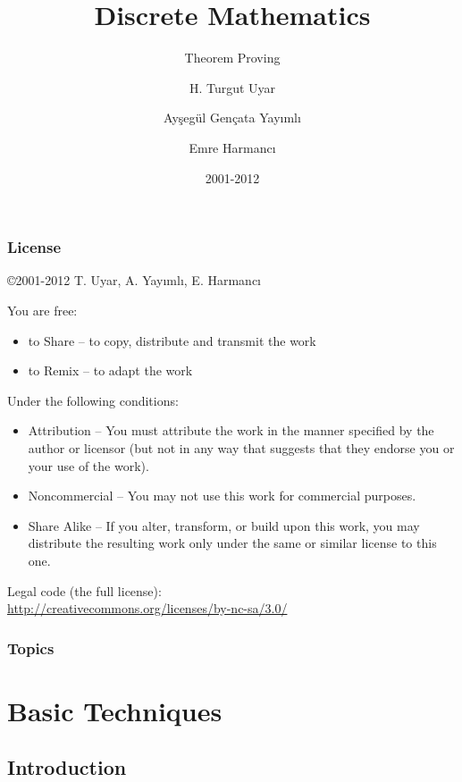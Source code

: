 \documentclass[dvipsnames]{beamer}
\title{Discrete Mathematics}
\subtitle{Theorem Proving}
\author{H. Turgut Uyar \and Ayşegül Gençata Yayımlı \and Emre Harmancı}
\date{2001-2012}
\begin{document}
\begin{frame}
  \titlepage
\end{frame}

\begin{frame}
  \frametitle{License}

  \hfill
  \copyright 2001-2012 T. Uyar, A. Yayımlı, E. Harmancı

  \vfill
  \begin{tiny}
    You are free:
    \begin{itemize}
      \item to Share -- to copy, distribute and transmit the work
      \item to Remix -- to adapt the work
    \end{itemize}

    Under the following conditions:
    \begin{itemize}
      \item Attribution -- You must attribute the work in the manner specified by
        the author or licensor (but not in any way that suggests that they
        endorse you or your use of the work).

      \item Noncommercial -- You may not use this work for commercial purposes.

      \item Share Alike -- If you alter, transform, or build upon this work, you
        may distribute the resulting work only under the same or similar license
        to this one.
    \end{itemize}
  \end{tiny}

  \vfill
  Legal code (the full license):\\
  \url{http://creativecommons.org/licenses/by-nc-sa/3.0/}
\end{frame}

\begin{frame}
  \frametitle{Topics}
  \tableofcontents
\end{frame}

\section{Basic Techniques}

\subsection{Introduction}
\end{document}
